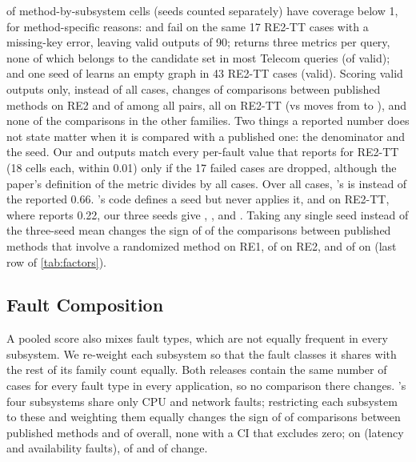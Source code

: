 \NCovBelowOne of \NCovCells method-by-subsystem cells (seeds counted separately) have coverage below 1, for method-specific reasons: \tracerca and \microrank fail on the same 17 RE2-TT cases with a missing-key error, leaving \CovTraceValid valid outputs of 90; \ediag returns three metrics per query, none of which belongs to the candidate set in most \openrca Telecom queries (\CovEdTelValid of \CovEdTelN valid); and one seed of \causalrca learns an empty graph in 43 RE2-TT cases (\CovCrSeedOneValid valid).
Scoring valid outputs only, instead of all cases, changes \DenReTwoPubSign of \DenReTwoPubComp comparisons between published methods on RE2 and \DenReTwoAllSign of \DenReTwoAllComp among all pairs, all on RE2-TT (\circa vs \tracerca moves from \DenCircaTraceAll to \DenCircaTraceValid), and none of the \DenOtherComp comparisons in the other families.
Two things a reported number does not state matter when it is compared with a published one: the denominator and the seed.
Our \tracerca and \microrank outputs match every per-fault value that \rcaeval reports for RE2-TT (18 cells each, within 0.01) only if the 17 failed cases are dropped, although the paper's definition of the metric divides by all cases.
Over all cases, \tracerca's \acc is \CovTraceAll instead of the reported 0.66.
\causalrca's code defines a seed but never applies it, and on RE2-TT, where \rcaeval reports 0.22, our three seeds give \CovCrReTwoTTSeedZero, \CovCrReTwoTTSeedOne, and \CovCrReTwoTTSeedTwo.
Taking any single seed instead of the three-seed mean changes the sign of \SeedReOnePubSign of the \SeedReOnePubComp comparisons between published methods that involve a randomized method on RE1, \SeedReTwoPubSign of \SeedReTwoPubComp on RE2, and \SeedOpenrcaPubSign of \SeedOpenrcaPubComp on \openrca (last row of \cref{tab:factors}).

\subsection{Fault Composition}
\label{sec:rq2-fault}

A pooled score also mixes fault types, which are not equally frequent in every subsystem.
We re-weight each subsystem so that the fault classes it shares with the rest of its family count equally.
Both \rcaeval releases contain the same number of cases for every fault type in every application, so no comparison there changes.
\openrca's four subsystems share only CPU and network faults; restricting each subsystem to these and weighting them equally changes the sign of \FwOpenrcaPubSign of \FwOpenrcaPubComp comparisons between published methods and \FwOpenrcaAllSign of \FwOpenrcaAllComp overall, none with a CI that excludes zero; on \petshop (latency and availability faults), \FwPetshopPubSign of \FwPetshopPubComp and \FwPetshopAllSign of \FwPetshopAllComp change.

